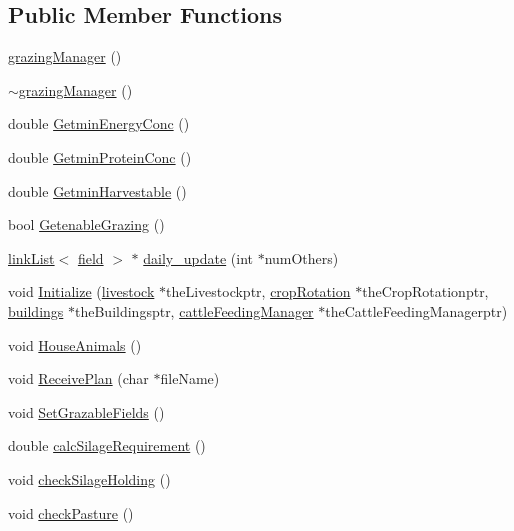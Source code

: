 \subsection*{Public Member Functions}
\begin{DoxyCompactItemize}
\item 
\hyperlink{classgrazing_manager_a278deab30e954617cdd90a482e309f3f}{grazingManager} ()
\item 
\hyperlink{classgrazing_manager_ae9e0a96a199a9e571fed2f9728444885}{$\sim$grazingManager} ()
\item 
double \hyperlink{classgrazing_manager_abfbe66462e43096b46212a43593c7946}{GetminEnergyConc} ()
\item 
double \hyperlink{classgrazing_manager_a9f6be4124bbe7f6c22d102ed1fe24822}{GetminProteinConc} ()
\item 
double \hyperlink{classgrazing_manager_a464823a852c221687853e2978baa70e0}{GetminHarvestable} ()
\item 
bool \hyperlink{classgrazing_manager_a434fb905e1ade1610778a54baebb3cb3}{GetenableGrazing} ()
\item 
\hyperlink{classlink_list}{linkList}$<$ \hyperlink{classfield}{field} $>$ $\ast$ \hyperlink{classgrazing_manager_add090eda9935ad4665d5388587aa5801}{daily\_\-update} (int $\ast$numOthers)
\item 
void \hyperlink{classgrazing_manager_a8929fd866876ba054eeeb2dfd02e688b}{Initialize} (\hyperlink{classlivestock}{livestock} $\ast$theLivestockptr, \hyperlink{classcrop_rotation}{cropRotation} $\ast$theCropRotationptr, \hyperlink{classbuildings}{buildings} $\ast$theBuildingsptr, \hyperlink{classcattle_feeding_manager}{cattleFeedingManager} $\ast$theCattleFeedingManagerptr)
\item 
void \hyperlink{classgrazing_manager_a0790c1be6eea4fbc391a89814b7dac99}{HouseAnimals} ()
\item 
void \hyperlink{classgrazing_manager_a9f1919dad1cc77b8d229ed9b13a470d9}{ReceivePlan} (char $\ast$fileName)
\item 
void \hyperlink{classgrazing_manager_a84c7728ec93315511d221ae456e997dd}{SetGrazableFields} ()
\item 
double \hyperlink{classgrazing_manager_a17ced3f230c570a362648df3d519b3fa}{calcSilageRequirement} ()
\item 
void \hyperlink{classgrazing_manager_a2e2fd9f45d1eb2136fd4ee7e1fc5d8fd}{checkSilageHolding} ()
\item 
void \hyperlink{classgrazing_manager_ad37ec0ac24feb05e89ea2af7ad547d0c}{checkPasture} ()

\end{DoxyCompactItemize}

